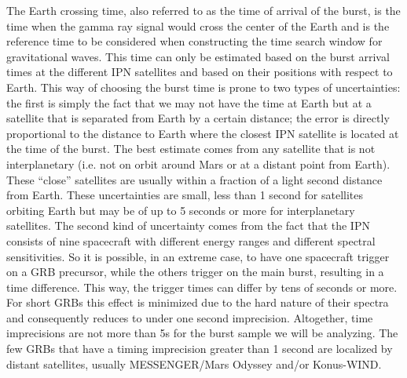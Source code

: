The Earth crossing time, also referred to as the time of arrival of the burst, is the time when the gamma ray signal would cross the center of the Earth and is the reference time to be considered when constructing the time search window for gravitational waves. 
This time can only be estimated based on the burst arrival times at the different IPN satellites and based on their positions with respect to Earth. This way of choosing the burst time is prone to two types of uncertainties: the first is simply the fact that we may not have the time at Earth but at a satellite that is separated from Earth by a certain distance; the error is directly proportional to the distance to Earth where the closest IPN satellite is located at the time of the burst. The best estimate comes from any satellite that is not interplanetary (i.e. not on orbit around Mars or at a distant point from Earth).  These ``close'' satellites are usually within a fraction of a light second distance from Earth.  These uncertainties are small, less than 1 second for satellites orbiting Earth but may be of up to 5 seconds or more for interplanetary satellites. The second kind of uncertainty comes from the fact that the IPN consists of nine spacecraft with different energy ranges and different spectral sensitivities. So it is possible, in an extreme case, to have one spacecraft trigger on a GRB precursor, while the others trigger on the main burst, resulting in a time difference.  This way, the trigger times can differ by tens of seconds or more.  For short GRBs this effect is minimized due to the hard nature of their spectra and consequently reduces to under one second imprecision. Altogether, time imprecisions are not more than 5s for the burst sample we will be analyzing. The few GRBs that have a timing imprecision greater than 1 second are localized by distant satellites, usually MESSENGER/Mars Odyssey and/or Konus-WIND.

